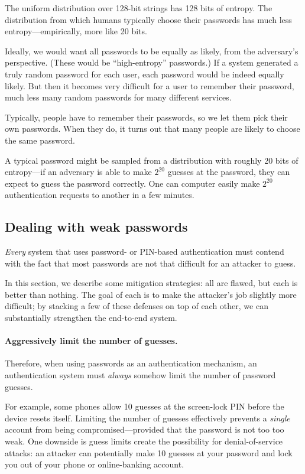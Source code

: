 The uniform distribution over 128-bit strings has 128 bits of entropy.
The distribution from which humans typically choose their passwords
has much less entropy---empirically, more like 20 bits.

Ideally, we would want all passwords to be equally as likely,
from the adversary's perspective.
(These would be ``high-entropy'' passwords.)
If a system generated a truly random password for each user,
each password would be indeed equally likely.
But then it becomes very difficult for a user to remember their 
password, much less many random passwords for many different services.

Typically, people have to remember their passwords,
so we let them pick their own passwords.
When they do,
it turns out that many people are likely to choose
the same password.

A typical password might be sampled from a distribution with roughly
20 bits of 
entropy---if an adversary is able to make $2^{20}$ guesses
at the password, they can expect to guess the password correctly.
One can computer easily make $2^{20}$
authentication requests to another in a few
minutes.

\subsection{Dealing with weak passwords}

\emph{Every} system that uses password- or PIN-based authentication
must contend with the fact that most passwords are not that difficult
for an attacker to guess.

In this section, we describe some mitigation strategies: all are flawed,
but each is better than nothing. The goal of each is to make the attacker's
job slightly more difficult; by stacking a few of these defenses on top
of each other, we can substantially strengthen the end-to-end system.

\paragraph{Aggressively limit the number of guesses.}
Therefore, when using passwords as an authentication
mechanism, an authentication system must \emph{always} 
somehow limit the number of password guesses.

For example, some phones allow 10 guesses at the screen-lock PIN 
before the device resets itself.
Limiting the number of guesses effectively prevents a \emph{single}
account from being compromised---provided that the password is not
too too weak.
One downside is guess limits create the possibility for denial-of-service
attacks: an attacker can potentially make 10 guesses at your password and lock
you out of your phone or online-banking account.


